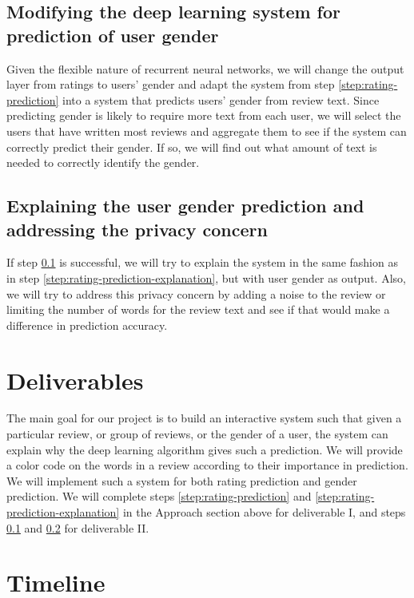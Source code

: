 \documentclass[11pt, twocolumn]{article}
\begin{document}
\subsection{Modifying the deep learning system for prediction of user gender}
\label{step:gender-prediction}

Given the flexible nature of recurrent neural networks, we will change the output layer from ratings to users' gender and adapt the system from step \ref{step:rating-prediction} into a system that predicts users' gender from review text. Since predicting gender is likely to require more text from each user, we will select the users that have written most reviews and aggregate them to see if the system can correctly predict their gender. If so, we will find out what amount of text is needed to correctly identify the gender.

\subsection{Explaining the user gender prediction and addressing the privacy concern}
\label{step:gender-prediction-explanation}

If step \ref{step:gender-prediction} is successful, we will try to explain the system in the same fashion as in step \ref{step:rating-prediction-explanation}, but with user gender as output. Also, we will try to address this privacy concern by adding a noise to the review or limiting the number of words for the review text and see if that would make a difference in prediction accuracy. 

\section{Deliverables}

The main goal for our project is to build an interactive system such that given a particular review, or group of reviews, or the gender of a user, the system can explain why the deep learning algorithm gives such a prediction. We will provide a color code on the words in a review according to their importance in prediction. We will implement such a system for both rating prediction and gender prediction. We will complete steps \ref{step:rating-prediction} and \ref{step:rating-prediction-explanation} in the Approach section above for deliverable I, and steps \ref{step:gender-prediction} and \ref{step:gender-prediction-explanation} for deliverable II. 

\section{Timeline}
\end{document}
